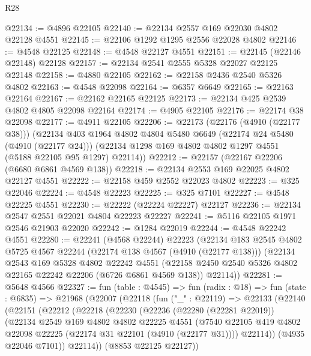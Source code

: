 \begin{lexlean}{R28}
\begin{coremodule}
@22134 := @4896 @22105
@22140 := @22134 @2557 @169 @22030 @4802 @22128 @4551
@22145 := @22106 @1292 @1295 @2556 @22028 @4802
@22146 := @4548 @22125
@22148 := @4548 @22127 @4551
@22151 := @22145 (@22146 @22148) @22128
@22157 := @22134 @2541 @2555 @5328 @22027 @22125 @22148
@22158 := @4880 @22105
@22162 := @22158 @2436 @2540 @5326 @4802
@22163 := @4548 @22098
@22164 := @6357 @6649
@22165 := @22163 @22164
@22167 := @22162 @22165 @22125
@22173 := @22134 @425 @2539 @4802 @4805 @22098 @22164
@22174 := @4905 @22105
@22176 := @22174 @38 @22098
@22177 := @4911 @22105
@22206 := @22173
    (@22176 (@4910 (@22177 @38)))
    (@22134
      @403
      @1964
      @4802
      @4804
      @5480
      @6649
      (@22174 @24 @5480 (@4910 (@22177 @24)))
      (@22134 @1298 @169 @4802 @4802 @1297 @4551 (@5188 @22105 @95 @1297) @22114))
@22212 := @22157 (@22167 @22206 (@6680 @6861 @4569 @138))
@22218 := @22134 @2553 @169 @22025 @4802 @22127 @4551
@22222 := @22158 @459 @2552 @22023 @4802
@22223 := @325 @22046
@22224 := @4548 @22223
@22225 := @325 @7101
@22227 := @4548 @22225 @4551
@22230 := @22222 (@22224 @22227) @22127
@22236 := @22134 @2547 @2551 @22021 @4804 @22223 @22227
@22241 := @5116 @22105 @1971 @2546 @21903 @22020
@22242 := @1284 @22019
@22244 := @4548 @22242 @4551
@22280 := @22241
    (@4568 @22244)
    @22223
    (@22134
      @183
      @2545
      @4802
      @5725
      @4567
      @22244
      (@22174 @138 @4567 (@4910 (@22177 @138)))
      (@22134
        @2543
        @169
        @5328
        @4802
        @22242
        @4551
        (@22158 @2450 @2540 @5326 @4802 @22165 @22242 @22206 (@6726 @6861 @4569 @138))
        @22114))
@22281 := @5648 @4566
@22327 := fun (table : @4545) =>
  fun (radix : @18) =>
  fun (state : @6835) =>
  @21968
    (@22007
      (@22118
        (fun ("_" : @22119) =>
        @22133
          (@22140
            (@22151
              (@22212
                (@22218
                  (@22230
                    (@22236
                      (@22280 (@22281 @22019))
                      (@22134
                        @2549
                        @169
                        @4802
                        @4802
                        @22225
                        @4551
                        (@7540
                          @22105
                          @419
                          @4802
                          @22098
                          @22225
                          (@22174 @31 @22101 (@4910 (@22177 @31))))
                        @22114))
                    (@4935 @22046 @7101))
                  @22114))
              (@8853 @22125 @22127))

\end{coremodule}
\end{lexlean}
